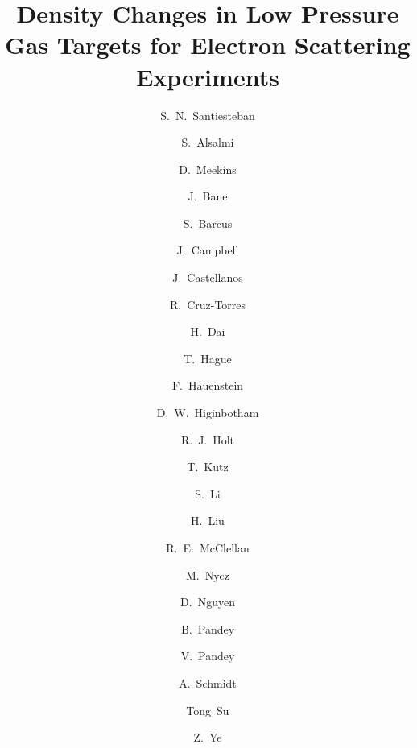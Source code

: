 \documentclass[final,5p,times,twocolumn]{elsarticle}
\begin{document}
\begin{frontmatter}



\title{Density Changes in Low Pressure Gas Targets for Electron Scattering Experiments}

\author[UNH]{S.~N.~Santiesteban}
\author[Kent]{S.~Alsalmi}
\author[JLab]{D.~Meekins}
\author[TN]{J.~Bane}
\author[WM]{S.~Barcus}
\author[SM]{J.~Campbell}
\author[FI]{J.~Castellanos}
\author[MIT]{R.~Cruz-Torres}
\author[VT]{H.~Dai}
\author[Kent]{T.~Hague}
\author[OD]{F.~Hauenstein}
\author[JLab]{D.~W.~Higinbotham}
\author[argonne,CalTech]{R.~J.~Holt}
\author[SB]{T.~Kutz}
\author[UNH]{S.~Li}
\author[COL]{H.~Liu}
\author[JLab]{R.~E.~McClellan}
\author[Kent]{M.~Nycz}
\author[UVa]{ D.~Nguyen}
\author[hampton]{B.~Pandey}
\author[VT]{V.~Pandey}
\author[MIT]{A.~Schmidt}
\author[Kent]{Tong~Su}
\author[argonne]{Z.~Ye}


\address[UNH]{University of New Hampshire, Durham, New Hampshire 03824, USA}
\address[Kent]{Kent State University, Kent, Ohio 44240, USA}
\address[JLab]{Jefferson Lab, Newport News, Virginia 23601 USA}
\address[TN]{The University of Tennessee, Knoxville, Tennessee 37996, USA}
\address[WM]{The College of William and Mary, Williamsburg, Virginia 23187, USA}
\address[SM]{Saint Mary's University, Halifax, Nova Scotia, Canada}
\address[FI]{Florida International University, Miami, Florida 33199 USA}
\address[MIT]{Massachusetts Institute of Technology, Cambridge, Massachusetts 02139, USA}
\address[VT]{Center for Neutrino Physics, Virginia Tech, Blacksburg, Virginia 24061, USA}
\address[OD]{Old Dominion University, Norfolk, Virginia 23529, USA}
\address[CalTech]{Kellogg radiation Laboratory, California Institute of Technology, Pasadena California 91125 USA}
\address[argonne]{Physics Division, Argonne National Laboratory, Argonne, Illinois 60439, USA}
\address[COL]{Columbia University, New York, New York 10027, USA}
\address[SB]{Stony Brook University, Stony Brook, New York 11794, USA}
\address[UVA]{Department of Physics, University of Virginia, Charlottesville, Virginia 22904, USA}
\address[hampton]{Hampton University, Hampton, Virginia 23669, USA}


\end{frontmatter}
\end{document}
